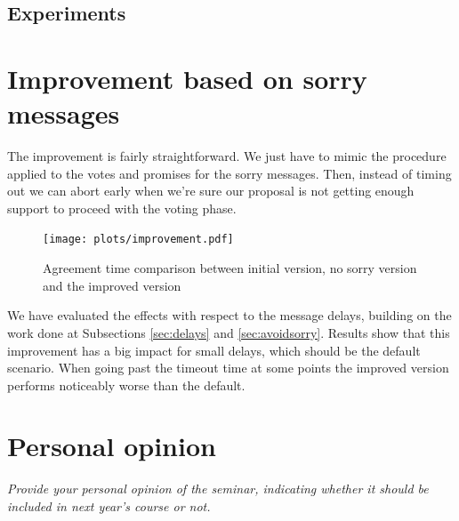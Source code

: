 \documentclass[a4paper, 10pt]{article}
\begin{document}
\subsection{Experiments}

\clearpage
\section{Improvement based on sorry messages}
\label{sec:improvement}

The improvement is fairly straightforward. We just have to mimic the procedure applied to the votes and promises for the sorry messages. Then, instead of timing out we can abort early when we're sure our proposal is not getting enough support to proceed with the voting phase.

\begin{figure}[H]
  \centering
  \texttt{[image: plots/improvement.pdf]}
    \caption{Agreement time comparison between initial version, no sorry version and the improved version}
\end{figure} 

We have evaluated the effects with respect to the message delays, building on the work done at Subsections \ref{sec:delays} and \ref{sec:avoidsorry}. Results show that this improvement has a big impact for small delays, which should be the default scenario. When going past the timeout time at some points the improved version performs noticeably worse than the default.

\clearpage
\section{Personal opinion}

\textit{Provide your personal opinion of the seminar, indicating whether it should be included in next year's course or not.}
\end{document}
